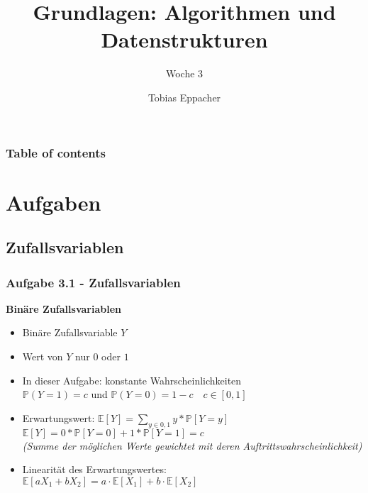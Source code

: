 \documentclass{beamer}
\title{Grundlagen: Algorithmen und Datenstrukturen}
\author{Tobias Eppacher}
\date{\presdatum}
\institute{School of Computation, Information and Technology}
\subtitle{Woche 3}
\begin{document}
\begin{frame}
	\titlepage
\end{frame}

\begin{frame}
	\frametitle{Table of contents}
	\tableofcontents[subsectionstyle=hide]
\end{frame}

\section{Aufgaben}

\subsection{Zufallsvariablen}
\begin{frame}
	\frametitle{Aufgabe 3.1 - Zufallsvariablen}
	\textbf{Binäre Zufallsvariablen} \\
	\begin{itemize}
		\item Binäre Zufallsvariable $Y$
		\item Wert von $Y$ nur $0$ oder $1$
		\item In dieser Aufgabe: konstante Wahrscheinlichkeiten \\
		      $\mathbb{P}(Y=1) = c$ und $\mathbb{P}(Y=0)=1-c \quad c \in [0, 1]$
		\item Erwartungswert: $\mathbb{E}[Y]=\sum_{y \in 0, 1} y * \mathbb{P}[Y=y]$ \\
		      $\mathbb{E}[Y]=0 * \mathbb{P}[Y=0] + 1 * \mathbb{P}[Y=1] = c$ \\
		      \smallskip
		      \textit{(Summe der möglichen Werte gewichtet mit deren Auftrittswahrscheinlichkeit)}
		\item Linearität des Erwartungswertes: \\
		      $\mathbb{E}[a X_1 + b X_2] = a \cdot \mathbb{E}[X_1] + b \cdot \mathbb{E}[X_2]$
	\end{itemize}
\end{frame}
\end{document}
